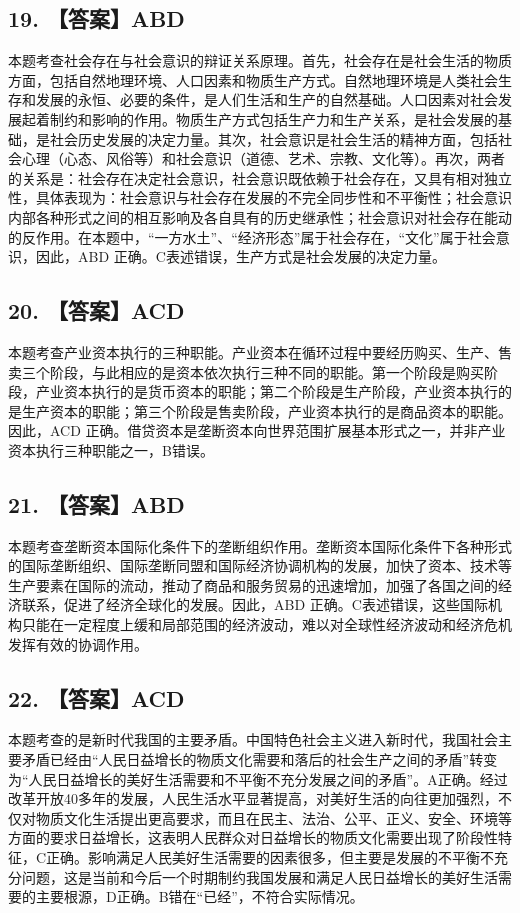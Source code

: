 \documentclass[UTF8,11pt]{ctexart}
\begin{document}
\subsection*{19. 【答案】ABD}

本题考查社会存在与社会意识的辩证关系原理。首先，社会存在是社会生活的物质方面，包括自然地理环境、人口因素和物质生产方式。自然地理环境是人类社会生存和发展的永恒、必要的条件，是人们生活和生产的自然基础。人口因素对社会发展起着制约和影响的作用。物质生产方式包括生产力和生产关系，是社会发展的基础，是社会历史发展的决定力量。其次，社会意识是社会生活的精神方面，包括社会心理（心态、风俗等）和社会意识（道德、艺术、宗教、文化等）。再次，两者的关系是：社会存在决定社会意识，社会意识既依赖于社会存在，又具有相对独立性，具体表现为：社会意识与社会存在发展的不完全同步性和不平衡性；社会意识内部各种形式之间的相互影响及各自具有的历史继承性；社会意识对社会存在能动的反作用。在本题中，“一方水土”、“经济形态”属于社会存在，“文化”属于社会意识，因此，ABD 正确。C表述错误，生产方式是社会发展的决定力量。


\subsection*{20. 【答案】ACD}

本题考查产业资本执行的三种职能。产业资本在循环过程中要经历购买、生产、售卖三个阶段，与此相应的是资本依次执行三种不同的职能。第一个阶段是购买阶段，产业资本执行的是货币资本的职能；第二个阶段是生产阶段，产业资本执行的是生产资本的职能；第三个阶段是售卖阶段，产业资本执行的是商品资本的职能。因此，ACD 正确。借贷资本是垄断资本向世界范围扩展基本形式之一，并非产业资本执行三种职能之一，B错误。


\subsection*{21. 【答案】ABD}

本题考查垄断资本国际化条件下的垄断组织作用。垄断资本国际化条件下各种形式的国际垄断组织、国际垄断同盟和国际经济协调机构的发展，加快了资本、技术等生产要素在国际的流动，推动了商品和服务贸易的迅速增加，加强了各国之间的经济联系，促进了经济全球化的发展。因此，ABD 正确。C表述错误，这些国际机构只能在一定程度上缓和局部范围的经济波动，难以对全球性经济波动和经济危机发挥有效的协调作用。


\subsection*{22. 【答案】ACD}

本题考查的是新时代我国的主要矛盾。中国特色社会主义进入新时代，我国社会主要矛盾已经由“人民日益增长的物质文化需要和落后的社会生产之间的矛盾”转变为“人民日益增长的美好生活需要和不平衡不充分发展之间的矛盾”。A正确。经过改革开放40多年的发展，人民生活水平显著提高，对美好生活的向往更加强烈，不仅对物质文化生活提出更高要求，而且在民主、法治、公平、正义、安全、环境等方面的要求日益增长，这表明人民群众对日益增长的物质文化需要出现了阶段性特征，C正确。影响满足人民美好生活需要的因素很多，但主要是发展的不平衡不充分问题，这是当前和今后一个时期制约我国发展和满足人民日益增长的美好生活需要的主要根源，D正确。B错在“已经”，不符合实际情况。
\end{document}

